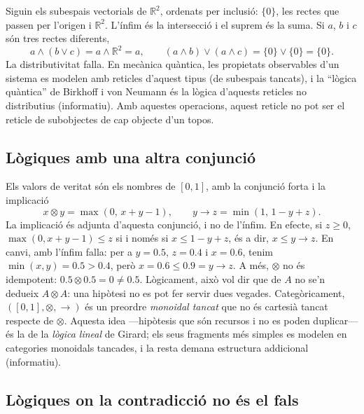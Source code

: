 \begin{exemple}
Siguin els subespais vectorials de $\mathbb R^2$, ordenats per inclusió: $\{0\}$, les rectes que passen per l'origen i $\mathbb R^2$. L'ínfim és la intersecció i el suprem és la suma. Si $a$, $b$ i $c$ són tres rectes diferents,
\[
a\wedge(b\vee c)=a\wedge\mathbb R^2=a,
\qquad
(a\wedge b)\vee(a\wedge c)=\{0\}\vee\{0\}=\{0\}.
\]
La distributivitat falla. En mecànica quàntica, les propietats observables d'un sistema es modelen amb reticles d'aquest tipus (de subespais tancats), i la \enquote{lògica quàntica} de Birkhoff i von Neumann és la lògica d'aquests reticles no distributius (informatiu). Amb aquestes operacions, aquest reticle no pot ser el reticle de subobjectes de cap objecte d'un topos.
\end{exemple}

\subsection{Lògiques amb una altra conjunció}

\begin{exemple}
Els valors de veritat són els nombres de $[0,1]$, amb la conjunció forta i la implicació
\[
x\otimes y=\max(0,\,x+y-1),\qquad y\to z=\min(1,\,1-y+z).
\]
La implicació és adjunta d'aquesta conjunció, i no de l'ínfim. En efecte, si $z\ge0$, $\max(0,x+y-1)\le z$ si i només si $x\le1-y+z$, és a dir, $x\le y\to z$. En canvi, amb l'ínfim falla: per a $y=0.5$, $z=0.4$ i $x=0.6$, tenim $\min(x,y)=0.5>0.4$, però $x=0.6\le0.9=y\to z$. A més, $\otimes$ no és idempotent: $0.5\otimes0.5=0\neq0.5$. Lògicament, això vol dir que de $A$ no se'n dedueix $A\otimes A$: una hipòtesi no es pot fer servir dues vegades. Categòricament, $([0,1],\otimes,\to)$ és un preordre \emph{monoidal tancat} que no és cartesià tancat respecte de $\otimes$. Aquesta idea ---hipòtesis que són recursos i no es poden duplicar--- és la de la \emph{lògica lineal} de Girard; els seus fragments més simples es modelen en categories monoidals tancades, i la resta demana estructura addicional (informatiu).
\end{exemple}

\subsection{Lògiques on la contradicció no és el fals}

